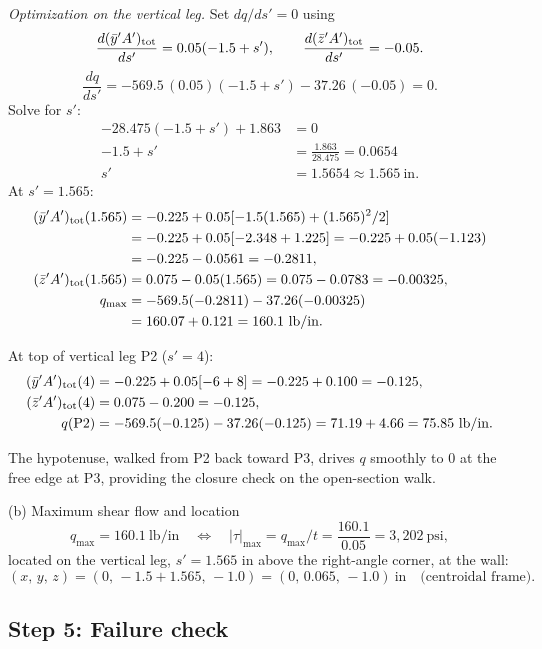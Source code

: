 \documentclass[11pt]{article}
\begin{document}
\emph{Optimization on the vertical leg.} Set $dq/ds' = 0$ using
\[
\frac{d(\bar y' A')_{\rm tot}}{ds'} = 0.05(-1.5 + s'),\qquad \frac{d(\bar z' A')_{\rm tot}}{ds'} = -0.05.
\]
\[
\frac{dq}{ds'} = -569.5\,(0.05)(-1.5 + s') - 37.26\,(-0.05) = 0.
\]
Solve for $s'$:
\begin{align*}
-28.475(-1.5 + s') + 1.863 &= 0\\
-1.5 + s' &= \frac{1.863}{28.475} = 0.0654\\
s' &= 1.5654 \approx 1.565\ \text{in}.
\end{align*}
At $s' = 1.565$:
\begin{align*}
(\bar y' A')_{\rm tot}(1.565) &= -0.225 + 0.05[-1.5(1.565) + (1.565)^2/2]\\
&= -0.225 + 0.05[-2.348 + 1.225] = -0.225 + 0.05(-1.123)\\
&= -0.225 - 0.0561 = -0.2811,\\
(\bar z' A')_{\rm tot}(1.565) &= 0.075 - 0.05(1.565) = 0.075 - 0.0783 = -0.00325,\\
q_{\max} &= -569.5(-0.2811) - 37.26(-0.00325)\\
&= 160.07 + 0.121 = 160.1\ \text{lb/in}.
\end{align*}

At top of vertical leg P2 ($s' = 4$):
\begin{align*}
(\bar y' A')_{\rm tot}(4) &= -0.225 + 0.05[-6 + 8] = -0.225 + 0.100 = -0.125,\\
(\bar z' A')_{\rm tot}(4) &= 0.075 - 0.200 = -0.125,\\
q(\text{P2}) &= -569.5(-0.125) - 37.26(-0.125) = 71.19 + 4.66 = 75.85\ \text{lb/in}.
\end{align*}

The hypotenuse, walked from P2 back toward P3, drives $q$ smoothly to $0$ at the free edge at P3, providing the closure check on the open-section walk.

\begin{answerbox}{(b) Maximum shear flow and location}
\[
q_{\max} = 160.1\ \text{lb/in}\quad\Longleftrightarrow\quad |\tau|_{\max} = q_{\max}/t = \frac{160.1}{0.05} = 3{,}202\ \text{psi},
\]
located on the vertical leg, $s' = 1.565$ in above the right-angle corner, at the wall:
\[
(x,\, y,\, z) = (0,\, -1.5 + 1.565,\, -1.0) = (0,\, 0.065,\, -1.0)\ \text{in}\quad\text{(centroidal frame).}
\]
\end{answerbox}

\subsection*{Step 5: Failure check}
\end{document}

